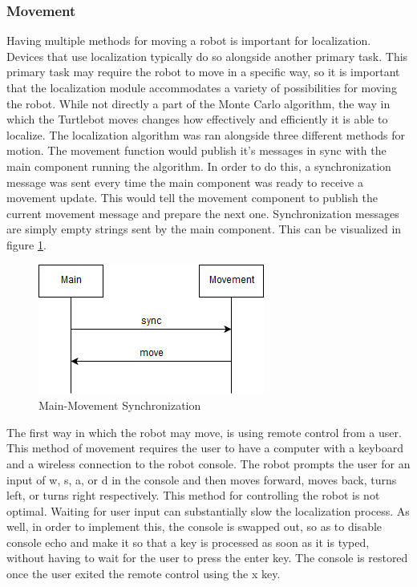 \documentclass{article}
\newcommand\tab[1][0.5cm]{\hspace*{#1}}
\newcounter{subsubsubsection}[subsubsection]
\begin{document}
\subsubsection{Movement}
\tab Having multiple methods for moving a robot is important for localization. Devices that use localization typically do so alongside another primary task. This primary task may require the robot to move in a specific way, so it is important that the localization module accommodates a variety of possibilities for moving the robot. While not directly a part of the Monte Carlo algorithm, the way in which the Turtlebot moves changes how effectively and efficiently it is able to localize. The localization algorithm was ran alongside three different methods for motion. The movement function would publish it's messages in sync with the main component running the algorithm. In order to do this, a synchronization message was sent every time the main component was ready to receive a movement update. This would tell the movement component to publish the current movement message and prepare the next one. Synchronization messages are simply empty strings sent by the main component. This can be visualized in figure \ref{fig:sync}.\\

\begin{figure}[h!]
\centering
\includegraphics[scale=0.75]{Sync.jpg}
\caption{Main-Movement Synchronization}
\label{fig:sync}
\end{figure}

\tab The first way in which the robot may move, is using remote control from a user. This method of movement requires the user to have a computer with a keyboard and a wireless connection to the robot console. The robot prompts the user for an input of w, s, a, or d in the console and then moves forward, moves back, turns left, or turns right respectively. This method for controlling the robot is not optimal. Waiting for user input can substantially slow the localization process. As well, in order to implement this, the console is swapped out, so as to disable console echo and make it so that a key is processed as soon as it is typed, without having to wait for the user to press the enter key. The console is restored once the user exited the remote control using the x key.\\
\end{document}
